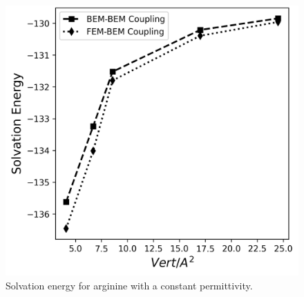 \begin{figure}
\centering
   \includegraphics[width=0.5\linewidth]{DolfinX_Arginine2_const_coeff_error.png}
\caption{Solvation energy for arginine with a constant permittivity. %
}
\label{fig:arg_constant_energy}
\end{figure}

